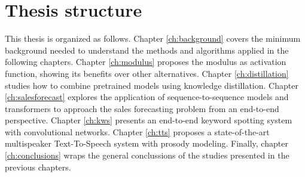 \section{Thesis structure}
This thesis is organized as follows. Chapter \ref{ch:background} covers the minimum background needed to understand the methods and algorithms applied in the following chapters. Chapter \ref{ch:modulus} proposes the modulus as activation function, showing its benefits over other alternatives. Chapter \ref{ch:distillation} studies how to combine pretrained models using knowledge distillation. Chapter \ref{ch:salesforecast} explores the application of sequence-to-sequence models and transformers to approach the sales forecasting problem from an end-to-end perspective. Chapter \ref{ch:kws} presents an end-to-end keyword spotting system with convolutional networks. Chapter \ref{ch:tts} proposes a state-of-the-art multispeaker Text-To-Speech system with prosody modeling. Finally, chapter \ref{ch:conclusions} wraps the general conclussions of the studies presented in the previous chapters.


